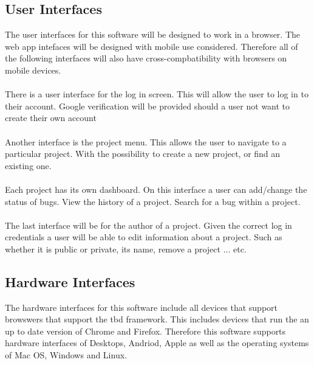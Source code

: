 \documentclass{article}
\newcommand{\comment}[1]{}
\begin{document}
\subsection{User Interfaces}
\comment{
	Describe the logical characteristics of each interface between the software product and users. This may include smaple screen images, any GUI standards or product family style guides that are to be followed, screen layout contraints, standard buttons and functions (e.g., help) that will appear on every screen, keyboard shortcuts, error message display standards, and so on. Define the software components for which a user interface is needed. Details of the user interface should be documented in a seperate user interface specification.
	}
The user interfaces for this software will be designed to work in a browser. The web app intefaces will be designed with mobile use considered. Therefore all of the following interfaces will also have cross-compbatibility with browsers on mobile devices.
\\ \\ 
There is a user interface for the log in screen. This will allow the user to log in to their account. Google verification will be provided should a user not want to create their own account 
\\ \\ 
Another interface is the project menu. This allows the user to navigate to a particular project. With the possibility to create a new project, or find an existing one.
\\ \\ 
Each project has its own dashboard. On this interface a user can add/change the status of bugs. View the history of a project. Search for a bug within a project.
\\ \\ 
The last interface will be for the author of a project. Given the correct log in credentials a user will be able to edit information about a project. Such as whether it is public or private, its name, remove a project ... etc. 
\subsection{Hardware Interfaces}
\comment{
Describe the logical and physical characteristics of each interface between the software product and the hardware components of the system. This may include the supported device types, the communication protocols to be used.
	}
The hardware interfaces for this software include all devices that support browswers that support the \acrshort{tbd} framework. This includes devices that run the an up to date version of Chrome and Firefox. Therefore this software supports hardware interfaces of Desktops, Andriod, Apple as well as the operating systems of Mac OS, Windows and Linux. 
\end{document}
